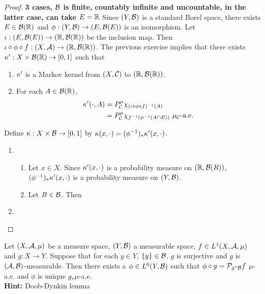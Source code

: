 \documentclass{book}
\begin{document}
	\begin{proof} \textbf{3 cases, $\mathcal{B}$ is finite, countably infinite and uncountable, in the latter case, can take $E = \mathbb{R}$}
		Since $(Y, \mathcal{B})$ is a standard Borel space, there exists $E \in \mathcal{B}(\mathbb{R})$ and $\phi: (Y, \mathcal{B}) \rightarrow (E, \mathcal{B}(E) )$ is an isomorphism. Let $\iota: (E, \mathcal{B}(E)) \rightarrow (\mathbb{R}, \mathcal{B}(\mathbb{R}))$ be the inclusion map. Then $\iota \circ \phi \circ f : (X, \mathcal{A}) \rightarrow (\mathbb{R}, \mathcal{B}(\mathbb{R}))$. The previous exercise implies that there exists $\kappa': X \times \mathcal{B}(\mathbb{R}) \rightarrow [0,1]$ such that  	
		\begin{enumerate}
			\item $\kappa'$ is a Markov kernel from $(X, \mathcal{C})$ to $(\mathbb{R}, \mathcal{B}(\mathbb{R}))$.
			\item For each $A \in \mathcal{B}(\mathbb{R})$,  
			\begin{align*}
				\kappa'(\cdot, A) 
				& = P^{\mu}_{\mathcal{C}}\chi_{(\iota \circ \phi \circ f)^{-1}(A)} \\
				& = P^{\mu}_{\mathcal{C}}\chi_{f^{-1}(\phi^{-1}(A \cap E))} \text{ $\mu_{\mathcal{C}}$-a.e.}\\
			\end{align*}
		\end{enumerate}
		Define $\kappa: X \times \mathcal{B} \rightarrow [0,1]$ by $\kappa(x, \cdot) = (\phi^{-1})_*\kappa'(x, \cdot)$. 
		\begin{enumerate}
			\item
			\begin{enumerate}
				\item  Let $x \in X$. Since $\kappa'(x, \cdot)$ is a probability measure on $(\mathbb{R}, \mathcal{B}(R))$, $(\phi^{-1})_*\kappa'(x, \cdot)$ is a probability measure on $(Y, \mathcal{B})$.
				\item Let $B \in \mathcal{B}$. Then 
			\end{enumerate}
			\item 
		\end{enumerate}
	\end{proof}
	
	\begin{ex} 
		Let $(X, \mathcal{A}, \mu)$ be a measure space, $(Y, \mathcal{B})$ a measurable space, $f \in L^1(X, \mathcal{A}, \mu)$ and $g: X \rightarrow Y$. Suppose that for each $y \in Y$, $\{y\} \in \mathcal{B}$, $g$ is surjective and $g$ is $(\mathcal{A}, \mathcal{B})$-measurable. Then there exists a $\phi \in L^0(Y, \mathcal{B})$ such that $\phi \circ g = \mathcal{P}_{g^*\mathcal{B}}f$ $\mu$-a.e. and $\phi$ is unique $g_*\mu$-a.e. \\
		\textbf{Hint:} Doob-Dynkin lemma
	\end{ex}	
	
\end{document}
